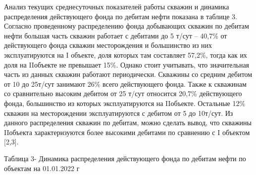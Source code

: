 Анализ текущих среднесуточных показателей работы скважин и динамика
распределения действующего фонда по дебитам нефти показана в таблице 3.
Согласно проведенному распределению фонда добывающих скважин по дебитам
нефти большая часть скважин работает с дебитами до 5 т/сут -- 40,7\% от
действующего фонда скважин месторождения и большинство из них
эксплуатируются на I объекте, доля которых там составляет 57,2\%, тогда
как их доля на IIобъекте не превышает 15\%. Однако стоит учитывать, что
значительная часть из данных скважин работают периодически. Скважины со
средним дебитом от 10 до 25т/сут занимают 26\% всего действующего фонда.
Также к скважинам со сравнительно высоким дебитом от 25 т/сут относится
20,7\% действующего фонда, большинство из которых эксплуатируются на
IIобъекте. Остальные 12\% скважин на месторождении эксплуатируются с
дебитом от 5 до 10т/сут. Из данного распределения скважин по дебитам,
можно сделать вывод, что скважины IIобъекта характеризуются более
высокими дебитами по сравнению с I объектом {[}2,3{]}.

Таблица 3- Динамика распределения действующего фонда по дебитам нефти по
объектам на 01.01.2022 г

